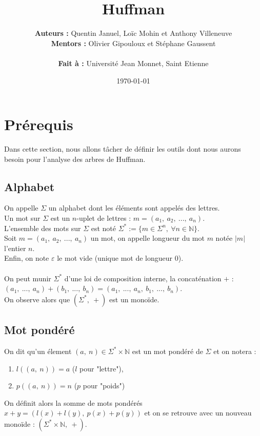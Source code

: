 \documentclass[a4paper, 12pt]{article}
\title{Huffman}
\author{
\textbf{Auteurs :} Quentin Januel, Loïc Mohin et Anthony Villeneuve \\
\textbf{Mentors :} Olivier Gipouloux et Stéphane Gaussent \\ \\
\textbf{Fait à :} Université Jean Monnet, Saint Etienne
}
\date{\today}
\begin{document}
\maketitle
\newpage
\tableofcontents{}
\newpage

\section{Prérequis}

Dans cette section, nous allons tâcher de définir les outils dont nous aurons besoin pour l'analyse des arbres de Huffman.

\subsection{Alphabet}
On appelle $\Sigma$ un alphabet dont les éléments sont appelés des lettres. \\
Un mot sur $\Sigma$ est un $n$-uplet de lettres : $m = (a_1,\ a_2,\ ...,\ a_n)$. \\
L'ensemble des mots sur $\Sigma$ est noté $\Sigma^* := \{m \in \Sigma^n,\ \forall n \in \mathbb{N}\}$. \\
Soit $m = (a_1,\ a_2,\ ...,\ a_n)$ un mot, on appelle longueur du mot $m$ notée $|m|$ l'entier $n$. \\
Enfin, on note $\varepsilon$ le mot vide (unique mot de longueur $0$). \\ \\
On peut munir $\Sigma^*$ d'une loi de composition interne, la concaténation $+$ : \\
$(a_1,\ ...,\ a_n)+(b_1,\ ...,\ b_n) = (a_1,\ ...,\ a_n,\ b_1,\ ...,\ b_n)$. \\
On observe alors que $(\Sigma^*,\ +)$ est un monoïde.

\subsection{Mot pondéré}
On dit qu'un élement $(a,\ n)\in \Sigma^*\times \mathbb{N}$ est un mot pondéré de $\Sigma$ et on notera :
\begin{enumerate}
\item $l((a,\ n)) = a$ ($l$ pour "lettre"),
\item $p((a,\ n)) = n$ ($p$ pour "poids")
\end{enumerate}
On définit alors la somme de mots pondérés $x+y = (l(x)+l(y),\ p(x)+p(y))$ et on se retrouve avec un nouveau monoïde :  $(\Sigma^*\times \mathbb{N},\ +)$.
\end{document}
